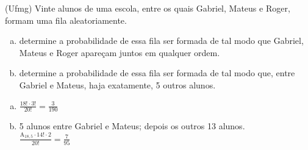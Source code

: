 \begin{ex}
 	(Ufmg) Vinte alunos de uma escola, entre os quais Gabriel, Mateus e Roger, formam uma fila aleatoriamente.
    \begin{enumerate}[(a)]
    \item determine a probabilidade de essa fila ser formada de tal modo que Gabriel, Mateus e Roger apareçam juntos em qualquer ordem.
    \item determine a probabilidade de essa fila ser formada de tal modo que, entre Gabriel e Mateus, haja exatamente, 5 outros alunos.
    \end{enumerate}
      \begin{sol}
        \phantom{A} 
          \begin{enumerate} [(a)]
              \item $\frac{18!\cdot3!}{20!}=\frac{3}{190}$
              \item 5 alunos entre Gabriel e Mateus; depois os outros 13 alunos.\\
              $\frac{\mathrm{A}_{{18},5}\cdot14!\cdot2}{20!}=\frac{7}{95}$
          \end{enumerate}
      \end{sol}
\end{ex}